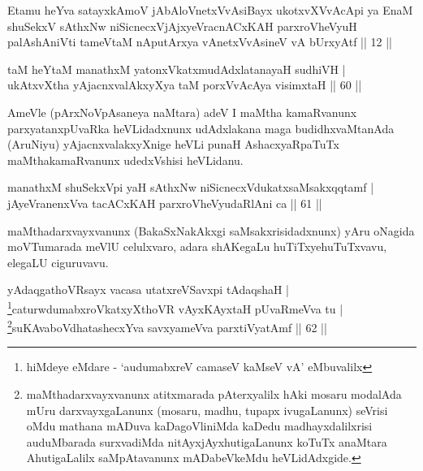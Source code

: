 \begin{kandikeshl}
Etamu heYva satayxkAmoV jAbAloV\s netxVvAsiBayx ukotxvXVvAcApi ya EnaM shuSekxV sAthxNw niSicnecxVjAjxyeVracnACxKAH parxroVheVyuH palAshAniVti tameVtaM nAputArxya vAnetxVvAsineV vA bUrxyAtf || 12 ||
\end{kandikeshl}


\begin{shl}
taM heYtaM manathxM yatonxVkatxmudAdxlatanayaH sudhiVH | \\
ukAtxvX\s tha yAjacnxvalAkxyXya taM porxVvAcAya visimxtaH \hfill|| 60 || 
\end{shl}

\begin{artha}
AmeVle (pArxNoVpAsaneya naMtara) adeV I maMtha kamaRvanunx 
parxyatanxpUvaRka heVLidadxnunx udAdxlakana maga budidhxvaMtanAda 
(AruNiyu) yAjacnxvalakxyXnige heVLi punaH AshacxyaRpaTuTx 
maMthakamaRvanunx udedxVshisi heVLidanu.
\end{artha}


\begin{shl}
manathxM shuSekxV\s pi yaH sAthxNw niSicnecxVdukatxsaMsakxqqtamf | \\
jAyeVranenxVva tacACxKAH parxroVheVyudaRlAni ca \hfill|| 61 || 
\end{shl}

\begin{artha}
maMthadarxvayxvanunx (BakaSxNakAkxgi saMsakxrisidadxnunx) yAru oNagida 
moVTumarada meVlU celulxvaro, adara shAKegaLu huTiTxye\break huTuTxvavu, 
elegaLU ciguruvavu.
\end{artha}


\begin{shl}
yAdaqgathoVR\s sayx vacasa utatxreVSavxpi tAdaqshaH | \\
\footnote{hiMdeye eMdare - `audumabxreV camaseV kaMseV vA' eMbuvalilx}caturwdumabxroVkatxyXthoVR vAyxKAyxtaH pUvaRmeVva tu | \\
\footnote{maMthadarxvayxvanunx atitxmarada pAterxyalilx hAki mosaru modalAda mUru darxvayxgaLanunx (mosaru, madhu, tupapx ivugaLanunx) seVrisi oMdu mathana mADuva kaDagoVliniMda kaDedu madhayxdalilxrisi auduMbarada surxvadiMda nitAyxjAyxhutigaLanunx koTuTx anaMtara AhutigaLalilx saMpAtavanunx mADabeVkeMdu heVLidAdxgide.}suKAvaboVdhatashecxYva savxyameVva parxtiVyatAmf \hfill|| 62 || 
\end{shl}


